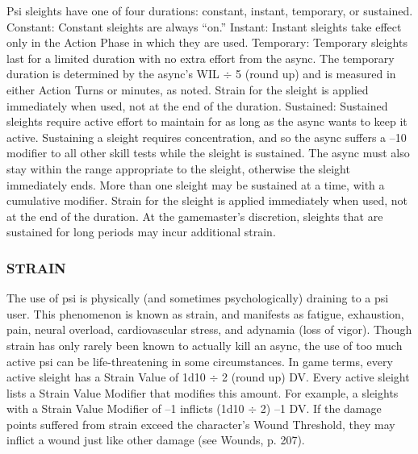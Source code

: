 Psi sleights have one of four durations: constant, instant, temporary, or sustained. Constant: Constant sleights are always “on.” Instant: Instant sleights take effect only in the Action Phase in which they are used. Temporary: Temporary sleights last for a limited duration with no extra effort from the async. The temporary duration is determined by the async’s WIL $\div$ 5 (round up) and is measured in either Action Turns or minutes, as noted. Strain for the sleight is applied immediately when used, not at the end of the duration. Sustained: Sustained sleights require active effort to maintain for as long as the async wants to keep it active. Sustaining a sleight requires concentration, and so the async suffers a –10 modifier to all other skill tests while the sleight is sustained. The async must also stay within the range appropriate to the sleight, otherwise the sleight immediately ends. More than one sleight may be sustained at a time, with a cumulative modifier. Strain for the sleight is applied immediately when used, not at the end of the duration. At the gamemaster’s discretion, sleights that are sustained for long periods may incur additional strain. 

\subsubsection{STRAIN} 

The use of psi is physically (and sometimes psychologically) draining to a psi user. This phenomenon is known as strain, and manifests as fatigue, exhaustion, pain, neural overload, cardiovascular stress, and adynamia (loss of vigor). Though strain has only rarely been known to actually kill an async, the use of too much active psi can be life-threatening in some circumstances. In game terms, every active sleight has a Strain Value of 1d10 $\div$ 2 (round up) DV. Every active sleight lists a Strain Value Modifier that modifies this amount. For example, a sleights with a Strain Value Modifier of –1 inflicts (1d10 $\div$ 2) –1 DV. If the damage points suffered from strain exceed the character’s Wound Threshold, they may inflict a wound just like other damage (see Wounds, p. 207). 

